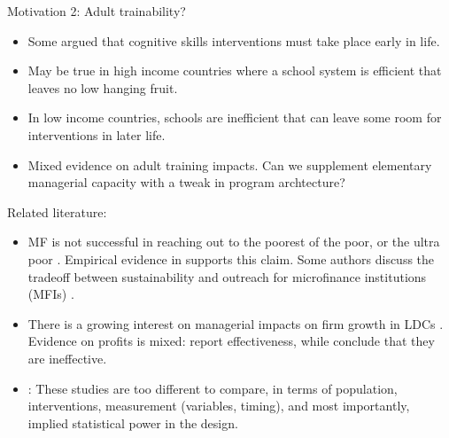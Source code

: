 \begin{frame}[label = background2]{}
Motivation 2: Adult trainability?
\begin{itemize}
\vspace{1.0ex}\setlength{\itemsep}{3.0ex}\setlength{\baselineskip}{12pt}
\pause
\item	Some argued that cognitive skills interventions must take place early in life.
\pause
\item	May be true in high income countries where a school system is efficient that leaves no low hanging fruit.
\pause
\item	In low income countries, schools are inefficient that can leave some room for interventions in later life.
\pause
\item	Mixed evidence on adult training impacts. \pause Can we supplement elementary managerial capacity with a tweak in program archtecture?
\end{itemize}
\end{frame}

\begin{frame}{}
Related literature: 
\begin{itemize}
\vspace{1.0ex}\setlength{\itemsep}{1.0ex}\setlength{\baselineskip}{12pt}
\item	MF is not successful in reaching out to the poorest of the poor, or the ultra poor \citep[][]{Scully2004}. Empirical evidence in \citet{Yaron1994, Navajas2000, RahmanRazzaque2000, AghionMorduch2007} supports this claim. Some authors discuss the tradeoff between sustainability and outreach for microfinance institutions (MFIs) \citet{HermesLensink2011, HermesLensinkMeesters2011, Cull2011}. 
\item	There is a growing interest on managerial impacts on firm growth in LDCs \citep[][]{deMel2008, Calderon2011, KarlanValvidia2011, Berge2012, Bruhn2012, MckenzieWoodruff2012, Bloometal2013}. Evidence on profits is mixed: \citet{Calderon2011, Berge2012, Bloometal2013} report effectiveness, while \citet{KarlanValvidia2011, Bruhn2012, KarlanKnightUdry2012} conclude that they are ineffective. 
\item	\citet{MckenzieWoodruff2012}: These studies are too different to compare, in terms of population, interventions, measurement (variables, timing), and most importantly, implied statistical power in the design. 
\end{itemize}
\end{frame}



